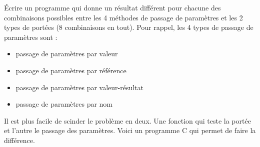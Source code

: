 \begin{Exercise}
  \label{ex:passage_portee}
Écrire un programme qui donne un résultat différent pour chacune des
combinaisons possibles entre les 4 méthodes de passage de paramètres et
les 2 types de portées (8 combinaisons en tout). Pour rappel, les 4
types de passage de paramètres sont :
\begin{itemize}
\item passage de paramètres par valeur 
\item passage de paramètres par référence
\item passage de paramètres par valeur-résultat
\item passage de paramètres par nom
\end{itemize}
\end{Exercise}

\begin{Answer}[ref={ex:passage_portee}]
  Il est plus facile de scinder le problème en deux. Une fonction qui teste la
  portée et l'autre le passage des paramètres. Voici un programme C qui permet
  de faire la différence.
  

\end{Answer}